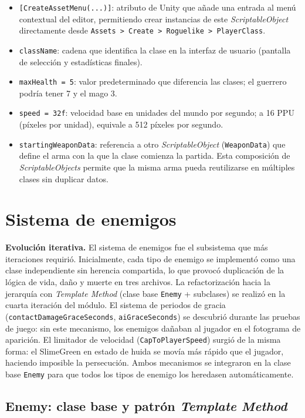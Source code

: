 \begin{itemize}
\item \texttt{[CreateAssetMenu(...)]}: atributo de Unity que añade una entrada al menú contextual del editor, permitiendo crear instancias de este \textit{ScriptableObject} directamente desde \texttt{Assets > Create > Roguelike > PlayerClass}.
\item \texttt{className}: cadena que identifica la clase en la interfaz de usuario (pantalla de selección y estadísticas finales).
\item \texttt{maxHealth = 5}: valor predeterminado que diferencia las clases; el guerrero podría tener 7 y el mago 3.
\item \texttt{speed = 32f}: velocidad base en unidades del mundo por segundo; a 16 PPU (píxeles por unidad), equivale a 512 píxeles por segundo.
\item \texttt{startingWeaponData}: referencia a otro \textit{ScriptableObject} (\texttt{WeaponData}) que define el arma con la que la clase comienza la partida. Esta composición de \textit{ScriptableObjects} permite que la misma arma pueda reutilizarse en múltiples clases sin duplicar datos.
\end{itemize}

\section{Sistema de enemigos}


\textbf{Evolución iterativa.} El sistema de enemigos fue el subsistema que más iteraciones requirió. Inicialmente, cada tipo de enemigo se implementó como una clase independiente sin herencia compartida, lo que provocó duplicación de la lógica de vida, daño y muerte en tres archivos. La refactorización hacia la jerarquía con \textit{Template Method} (clase base \texttt{Enemy} + subclases) se realizó en la cuarta iteración del módulo. El sistema de periodos de gracia (\texttt{contactDamageGraceSeconds}, \texttt{aiGraceSeconds}) se descubrió durante las pruebas de juego: sin este mecanismo, los enemigos dañaban al jugador en el fotograma de aparición. El limitador de velocidad (\texttt{CapToPlayerSpeed}) surgió de la misma forma: el SlimeGreen en estado de huida se movía más rápido que el jugador, haciendo imposible la persecución. Ambos mecanismos se integraron en la clase base \texttt{Enemy} para que todos los tipos de enemigo los heredasen automáticamente.

\subsection{Enemy: clase base y patrón \textit{Template Method}}


